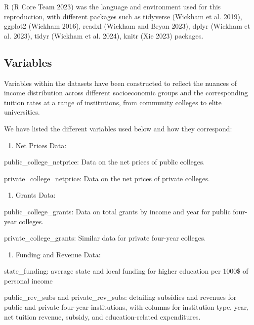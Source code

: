 \documentclass[
  letterpaper,
  DIV=11,
  numbers=noendperiod]{scrartcl}
\providecommand{\tightlist}{%
  \setlength{\itemsep}{0pt}\setlength{\parskip}{0pt}}\usepackage{longtable,booktabs,array}
\begin{document}
R (R Core Team 2023) was the language and environment used for this
reproduction, with different packages such as tidyverse (Wickham et al.
2019), ggplot2 (Wickham 2016), readxl (Wickham and Bryan 2023), dplyr
(Wickham et al. 2023), tidyr (Wickham et al. 2024), knitr (Xie 2023)
packages.

\subsection{Variables}\label{variables}

Variables within the datasets have been constructed to reflect the
nuances of income distribution across different socioeconomic groups and
the corresponding tuition rates at a range of institutions, from
community colleges to elite universities.

We have listed the different variables used below and how they
correspond:

\begin{enumerate}
\def\labelenumi{\arabic{enumi}.}
\tightlist
\item
  Net Prices Data:
\end{enumerate}

public\_college\_netprice: Data on the net prices of public colleges.

private\_college\_netprice: Data on the net prices of private colleges.

\begin{enumerate}
\def\labelenumi{\arabic{enumi}.}
\setcounter{enumi}{1}
\tightlist
\item
  Grants Data:
\end{enumerate}

public\_college\_grants: Data on total grants by income and year for
public four-year colleges.

private\_college\_grants: Similar data for private four-year colleges.

\begin{enumerate}
\def\labelenumi{\arabic{enumi}.}
\setcounter{enumi}{2}
\tightlist
\item
  Funding and Revenue Data:
\end{enumerate}

state\_funding: average state and local funding for higher education per
1000\$ of personal income

public\_rev\_subs and private\_rev\_subs: detailing subsidies and
revenues for public and private four-year institutions, with columns for
institution type, year, net tuition revenue, subsidy, and
education-related expenditures.
\end{document}
